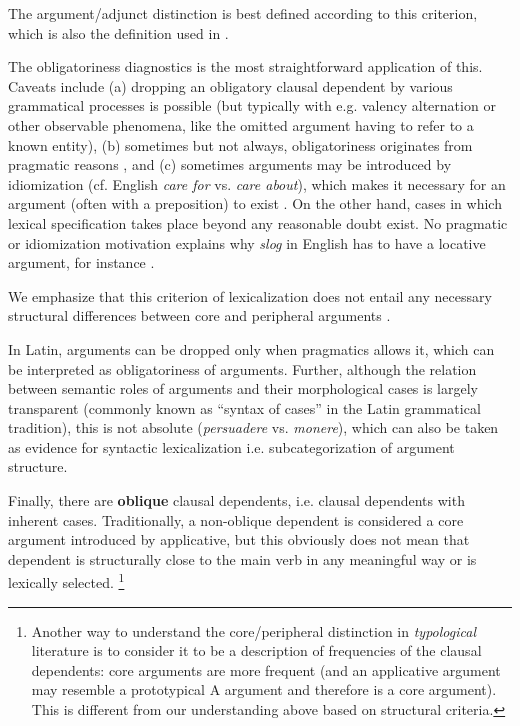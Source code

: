 \documentclass[a4paper, oneside, 12pt]{report}
\newcommand*{\citepage}[1]{p.~{#1}}
\newcommand*{\citepages}[1]{pp.~{#1}}
\newcommand*{\concept}[1]{\textbf{#1}}
\newcommand{\form}[1]{\emph{#1}}
\begin{document}
The argument/adjunct distinction is best defined according to this criterion,
which is also the definition used in \citet{cgel}.

The obligatoriness diagnostics is the most straightforward application of this.
Caveats include (a) dropping an obligatory clausal dependent by various grammatical processes is possible
(but typically with e.g. valency alternation or other observable phenomena,
like the omitted argument having to refer to a known entity),
(b) sometimes but not always, obligatoriness originates from pragmatic reasons
\citep[\citepages{113-115}]{mcinnerney2022argument}, and 
(c) sometimes arguments may be introduced by idiomization (cf. English \form{care for} vs. \form{care about}), which makes it necessary for an argument (often with a preposition) to exist \citep[\citepages{112-113}]{mcinnerney2022argument}.
On the other hand, cases in which lexical specification takes place beyond any reasonable doubt exist.
No pragmatic or idiomization motivation explains why \form{slog} in English has to have a locative argument, for instance \citep[\citepages{115-117}]{mcinnerney2022argument}.

We emphasize that this criterion of lexicalization does not entail any necessary structural differences between core and peripheral arguments
\citealt[\citepage{125}]{mcinnerney2022argument}.

In Latin, arguments can be dropped only when pragmatics allows it,
which can be interpreted as obligatoriness of arguments.
Further, although the relation between semantic roles of arguments and their morphological cases is largely transparent (commonly known as ``syntax of cases'' in the Latin grammatical tradition),
this is not absolute (\form{persuadere} vs. \form{monere}),
which can also be taken as evidence for syntactic lexicalization i.e. subcategorization of argument structure.

Finally, there are \concept{oblique} clausal dependents, i.e. clausal dependents with inherent cases.
Traditionally, a non-oblique dependent is considered a core argument introduced by applicative,
but this obviously does not mean that dependent is structurally close to the main verb in any meaningful way or is lexically selected.%
\footnote{
    Another way to understand the core/peripheral distinction in \emph{typological} literature is to consider it to be a description of frequencies of the clausal dependents:
    core arguments are more frequent (and an applicative argument may resemble a prototypical A argument and therefore is a core argument).
    This is different from our understanding above based on structural criteria.
}
\end{document}
